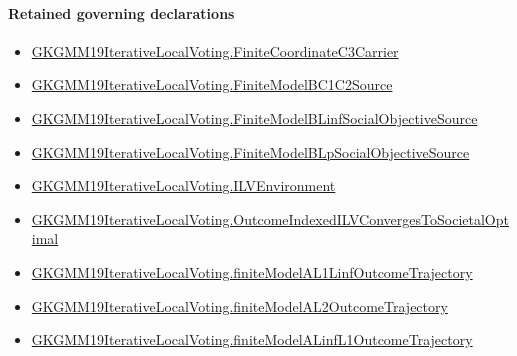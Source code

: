 \documentclass[10pt]{article}
\begin{document}
\paragraph{Retained governing declarations}
\begin{itemize}\raggedright
\item \hyperlink{governing-declaration-56987670c9ba555c}{GKGMM19\allowbreak{}Iterative\allowbreak{}Local\allowbreak{}Voting.\allowbreak{}Finite\allowbreak{}Coordinate\allowbreak{}C3\allowbreak{}Carrier}
\item \hyperlink{governing-declaration-b2172f203bb89b25}{GKGMM19\allowbreak{}Iterative\allowbreak{}Local\allowbreak{}Voting.\allowbreak{}Finite\allowbreak{}Model\allowbreak{}BC1\allowbreak{}C2\allowbreak{}Source}
\item \hyperlink{governing-declaration-e514cb09354be3be}{GKGMM19\allowbreak{}Iterative\allowbreak{}Local\allowbreak{}Voting.\allowbreak{}Finite\allowbreak{}Model\allowbreak{}B\allowbreak{}Linf\allowbreak{}Social\allowbreak{}Objective\allowbreak{}Source}
\item \hyperlink{governing-declaration-05cf1c1dee9d2a86}{GKGMM19\allowbreak{}Iterative\allowbreak{}Local\allowbreak{}Voting.\allowbreak{}Finite\allowbreak{}Model\allowbreak{}B\allowbreak{}Lp\allowbreak{}Social\allowbreak{}Objective\allowbreak{}Source}
\item \hyperlink{governing-declaration-df2ca62df1846667}{GKGMM19\allowbreak{}Iterative\allowbreak{}Local\allowbreak{}Voting.\allowbreak{}ILV\allowbreak{}Environment}
\item \hyperlink{governing-declaration-3e297ee911a81a7e}{GKGMM19\allowbreak{}Iterative\allowbreak{}Local\allowbreak{}Voting.\allowbreak{}Outcome\allowbreak{}Indexed\allowbreak{}ILV\allowbreak{}Converges\allowbreak{}To\allowbreak{}Societal\allowbreak{}Optimal}
\item \hyperlink{governing-declaration-fdfeb9d871d65d8b}{GKGMM19\allowbreak{}Iterative\allowbreak{}Local\allowbreak{}Voting.\allowbreak{}finite\allowbreak{}Model\allowbreak{}AL1\allowbreak{}Linf\allowbreak{}Outcome\allowbreak{}Trajectory}
\item \hyperlink{governing-declaration-103ade36d7667502}{GKGMM19\allowbreak{}Iterative\allowbreak{}Local\allowbreak{}Voting.\allowbreak{}finite\allowbreak{}Model\allowbreak{}AL2\allowbreak{}Outcome\allowbreak{}Trajectory}
\item \hyperlink{governing-declaration-a385449c1da028f5}{GKGMM19\allowbreak{}Iterative\allowbreak{}Local\allowbreak{}Voting.\allowbreak{}finite\allowbreak{}Model\allowbreak{}A\allowbreak{}Linf\allowbreak{}L1\allowbreak{}Outcome\allowbreak{}Trajectory}

\end{itemize}
\end{document}

